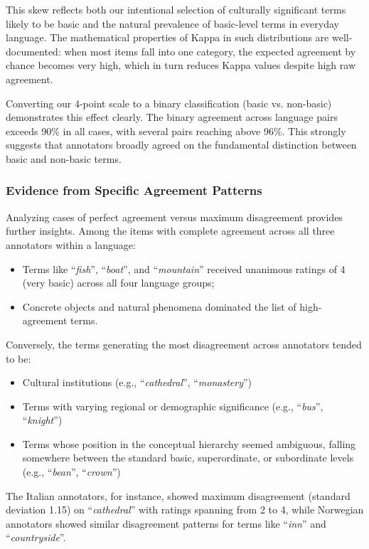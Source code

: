 \documentclass[preprint,12pt,authoryear]{elsarticle}
\begin{document}
This skew reflects both our intentional selection of culturally significant terms likely to be basic and the natural prevalence of basic-level terms in everyday language. The mathematical properties of Kappa in such distributions are well-documented: when most items fall into one category, the expected agreement by chance becomes very high, which in turn reduces Kappa values despite high raw agreement.

Converting our 4-point scale to a binary classification (basic vs. non-basic) demonstrates this effect clearly. The binary agreement across language pairs exceeds 90\% in all cases, with several pairs reaching above 96\%. This strongly suggests that annotators broadly agreed on the fundamental distinction between basic and non-basic terms.

\subsubsection{Evidence from Specific Agreement Patterns}

Analyzing cases of perfect agreement versus maximum disagreement provides further insights. Among the items with complete agreement across all three annotators within a language:

\begin{itemize}
\item Terms like ``\textit{fish}'', ``\textit{boat}'', and ``\textit{mountain}'' received unanimous ratings of 4 (very basic) across all four language groups;
\item Concrete objects and natural phenomena dominated the list of high-agreement terms.
\end{itemize}

Conversely, the terms generating the most disagreement across annotators tended to be:

\begin{itemize}
\item Cultural institutions (e.g., ``\textit{cathedral}'', ``\textit{monastery}'')
\item Terms with varying regional or demographic significance (e.g., ``\textit{bus}'', ``\textit{knight}'')
\item Terms whose position in the conceptual hierarchy seemed ambiguous, falling somewhere between the standard basic, superordinate, or subordinate levels (e.g., ``\textit{bean}'', ``\textit{crown}'')
\end{itemize}

The Italian annotators, for instance, showed maximum disagreement (standard deviation 1.15) on ``\textit{cathedral}'' with ratings spanning from 2 to 4, while Norwegian annotators showed similar disagreement patterns for terms like ``\textit{inn}'' and ``\textit{countryside}''.
\end{document}
